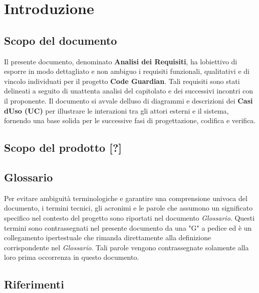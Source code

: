 \documentclass[12pt, a4paper]{article}
\begin{document}
\iftotalfigures
    \vspace{1cm}
    \listoffigures
\fi
\newpage


\section{Introduzione}\label{introduzione}

\subsection{Scopo del documento}\label{scopo-del-documento}

Il presente documento, denominato \textbf{Analisi dei Requisiti}, ha
l\textquotesingle obiettivo di esporre in modo dettagliato e non ambiguo
i requisiti funzionali, qualitativi e di vincolo individuati per il
progetto \textbf{Code Guardian}. Tali requisiti sono stati delineati a
seguito di un\textquotesingle attenta analisi del capitolato e dei
successivi incontri con il proponente. Il documento si avvale
dell\textquotesingle uso di diagrammi e descrizioni dei \textbf{Casi
d\textquotesingle Uso (UC)} per illustrare le interazioni tra gli attori
esterni e il sistema, fornendo una base solida per le successive fasi di
progettazione, codifica e verifica.

\subsection{Scopo del prodotto {[}?{]}}\label{scopo-del-prodotto}

\subsection{Glossario}\label{glossario}

Per evitare ambiguità terminologiche e garantire una comprensione
univoca del documento, i termini tecnici, gli acronimi e le parole che
assumono un significato specifico nel contesto del progetto sono
riportati nel documento \emph{Glossario}. Questi termini sono
contrassegnati nel presente documento da una "G" a pedice ed è un
collegamento ipertestuale che rimanda direttamente alla definizione
corrispondente nel \emph{Glossario}. Tali parole vengono contrassegnate
solamente alla loro prima occorrenza in questo documento.

\subsection{Riferimenti}\label{riferimenti}
\end{document}
